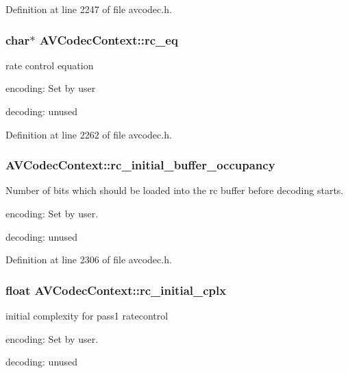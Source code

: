 Definition at line 2247 of file avcodec.\+h.

\subsubsection[{\texorpdfstring{rc\+\_\+eq}{rc_eq}}]{ char$\ast$ A\+V\+Codec\+Context\+::rc\+\_\+eq}\hypertarget{struct_a_v_codec_context_a5f58c561e939b0bbd9a149dafe5768eb}{}\label{struct_a_v_codec_context_a5f58c561e939b0bbd9a149dafe5768eb}
rate control equation
\begin{DoxyItemize}
\item encoding\+: Set by user
\item decoding\+: unused 
\end{DoxyItemize}

Definition at line 2262 of file avcodec.\+h.

\subsubsection[{\texorpdfstring{rc\+\_\+initial\+\_\+buffer\+\_\+occupancy}{rc_initial_buffer_occupancy}}]{ A\+V\+Codec\+Context\+::rc\+\_\+initial\+\_\+buffer\+\_\+occupancy}\hypertarget{struct_a_v_codec_context_a7546ebfa9e9ffede316576dced7e150c}{}\label{struct_a_v_codec_context_a7546ebfa9e9ffede316576dced7e150c}
Number of bits which should be loaded into the rc buffer before decoding starts.
\begin{DoxyItemize}
\item encoding\+: Set by user.
\item decoding\+: unused 
\end{DoxyItemize}

Definition at line 2306 of file avcodec.\+h.

\subsubsection[{\texorpdfstring{rc\+\_\+initial\+\_\+cplx}{rc_initial_cplx}}]{\setlength{\rightskip}{0pt plus 5cm}float A\+V\+Codec\+Context\+::rc\+\_\+initial\+\_\+cplx}\hypertarget{struct_a_v_codec_context_ac2ba8e7263aaf3526d5f92eb9ebb6d9c}{}\label{struct_a_v_codec_context_ac2ba8e7263aaf3526d5f92eb9ebb6d9c}
initial complexity for pass1 ratecontrol
\begin{DoxyItemize}
\item encoding\+: Set by user.
\item decoding\+: unused 
\end{DoxyItemize}


